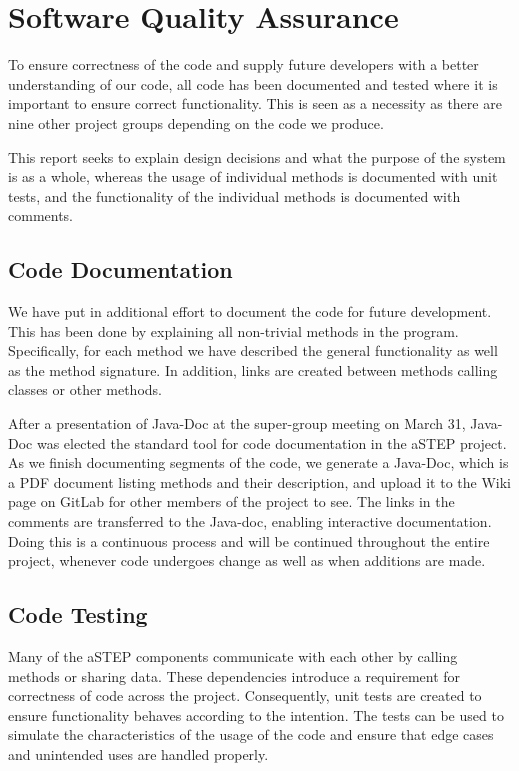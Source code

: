 \section{Software Quality Assurance}\label{sec:unit_test}
To ensure correctness of the code and supply future developers with a better understanding of our code, all code has been documented and tested where it is important to ensure correct functionality. This is seen as a necessity as there are nine other project groups depending on the code we produce.

This report seeks to explain design decisions and what the purpose of the system is as a whole, whereas the usage of individual methods is documented with unit tests, and the functionality of the individual methods is documented with comments.

\subsection{Code Documentation} \label{sec:code_documentation}
We have put in additional effort to document the code for future development. This has been done by explaining all non-trivial methods in the program. Specifically, for each method we have described the general functionality as well as the method signature. In addition, links are created between methods calling classes or other methods. 

After a presentation of Java-Doc at the super-group meeting on March 31, Java-Doc was elected the standard tool for code documentation in the aSTEP project.
As we finish documenting segments of the code, we generate a Java-Doc, which is a PDF document listing methods and their description, and upload it to the Wiki page \cite{dokumentation_astep} on GitLab for other members of the project to see. The links in the comments are transferred to the Java-doc, enabling interactive documentation. 
Doing this is a continuous process and will be continued throughout the entire project, whenever code undergoes change as well as when additions are made.

\subsection{Code Testing}\label{subsec:unit_testing}
Many of the aSTEP components communicate with each other by calling methods or sharing data. These dependencies introduce a requirement for correctness of code across the project. Consequently, unit tests are created to ensure functionality behaves according to the intention. The tests can be used to simulate the characteristics of the usage of the code and ensure that edge cases and unintended uses are handled properly. 

